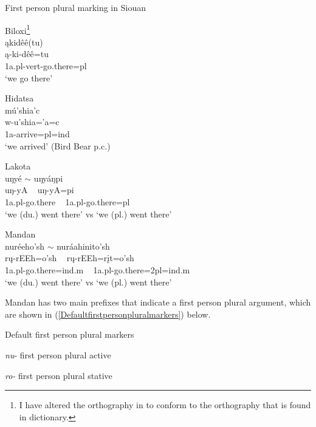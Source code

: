 \begin{exe}
\item\label{1stplmarking} First person plural marking in Siouan

	\begin{xlist}
	
	\item Biloxi\footnote{I have altered the orthography in \citet{einaudi1976} to conform to the orthography that is found in  dictionary.}\\
        \glll ąkidêê(tu)\\
	ą-ki-dêê=tu\\
	1a.pl-vert-\textnormal{go.there}=pl\\
	\glt `we go there' \citep[77]{einaudi1976} 
	
	\item Hidatsa\\
        \glll mú'shia'c\\
	w-u'shia='a=c\\
	1a-\textnormal{arrive}=pl=ind\\
	\glt `we arrived' (Bird Bear p.c.) 
	
	\item Lakota\\
        \glll uŋyé $\sim$ uŋyáŋpi\\
	uŋ-yA ~ uŋ-yA=pi\\
	1a.pl-\textnormal{go.there} ~ 1a.pl-\textnormal{go.there}=pl\\
	\glt `we (du.) went there' vs `we (pl.) went there' \citep[695]{ullrich2011} 
	
	\item Mandan\\
        \glll nuréeho'sh $\sim$ nuráahinito'sh\\
	rų-rEEh=o'sh ~ rų-rEEh=rįt=o'sh\\
	1a.pl-\textnormal{go.there}=ind.m ~ 1a.pl-\textnormal{go.there}=2pl=ind.m\\
	\glt `we (du.) went there' vs `we (pl.) went there'  
	\end{xlist}

\end{exe}

Mandan has two main prefixes that indicate a first person plural argument, which are shown in (\ref{Defaultfirstpersonpluralmarkers}) below. 

\begin{exe}
\item\label{Defaultfirstpersonpluralmarkers} Default first person plural markers

	\begin{xlist}
	\item \textit{nu}- first person plural active
	\item \textit{ro-} first person plural stative
	\end{xlist}

\end{exe}

